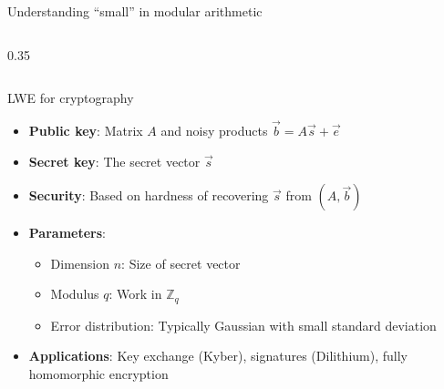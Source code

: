 \ifdefined\PRESENTATION\else\PassOptionsToClass{handout}{beamer}\fi\documentclass[aspectratio=169, lualatex]{beamer}
\begin{document}
\begin{frame}{Understanding ``small'' in modular arithmetic}
\begin{columns}[c]
\begin{column}{0.35\textwidth}
\begin{center}
			\end{center}
		\end{column}
	\end{columns}
\end{frame}

\begin{frame}{LWE for cryptography}
	\begin{itemize}
		\item \textbf{Public key}: Matrix $A$ and noisy products $\vec{b} = A\vec{s} + \vec{e}$
		\item \textbf{Secret key}: The secret vector $\vec{s}$
		\item \textbf{Security}: Based on hardness of recovering $\vec{s}$ from $(A, \vec{b})$
		\item \textbf{Parameters}:
		      \begin{itemize}
			      \item Dimension $n$: Size of secret vector
			      \item Modulus $q$: Work in $\mathbb{Z}_q$
			      \item Error distribution: Typically Gaussian with small standard deviation
		      \end{itemize}
		\item \textbf{Applications}: Key exchange (Kyber), signatures (Dilithium), fully homomorphic encryption
	\end{itemize}
\end{frame}
\end{document}
